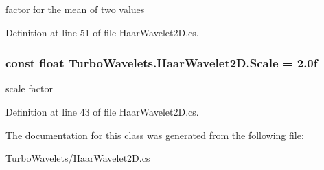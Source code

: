 factor for the mean of two values 



\-Definition at line 51 of file \-Haar\-Wavelet2\-D.\-cs.

\hypertarget{class_turbo_wavelets_1_1_haar_wavelet2_d_abb9a814259b4977ed274dde12f878f12}{
\subsubsection[{\-Scale}]{\setlength{\rightskip}{0pt plus 5cm}const float {\bf \-Turbo\-Wavelets.\-Haar\-Wavelet2\-D.\-Scale} = 2.\-0f}}\label{class_turbo_wavelets_1_1_haar_wavelet2_d_abb9a814259b4977ed274dde12f878f12}


scale factor 



\-Definition at line 43 of file \-Haar\-Wavelet2\-D.\-cs.



\-The documentation for this class was generated from the following file\-:\begin{DoxyCompactItemize}
\item 
\-Turbo\-Wavelets/\-Haar\-Wavelet2\-D.\-cs\end{DoxyCompactItemize}
